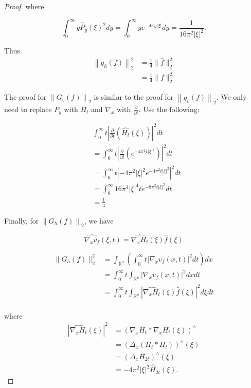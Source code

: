 \begin{enumerate}
\begin{proof}
	where

	\[
		\int_0^\infty y \widehat{P}_y(\xi) ^2 dy = \int_0^\infty y e^{-4 \pi y |\xi|} dy = \frac{1}{16 \pi^2 |\xi|^2}
	.\]

	Thus
	\begin{align*}
		\left\|g_h(f)\right\|_2^2
		&= \frac{1}{4} \|\hat{f}\|_2^2 \\
		&= \frac{1}{4} \|f\|_2^2
	\end{align*}

	The proof for $\left\|G_v(f)\right\|_2$ is similar to the proof for $\left\|g_v(f)\right\|_2$. We only need to replace $P_y$ with $H_t$ and $\nabla_x$ with $\frac{\partial}{\partial t}$. Use the following:

	\begin{align*}
		&\int_{0}^{\infty} t \left| \frac{\partial}{\partial t} \left( \hat{H_t}(\xi) \right) \right| ^2 d t \\
		&= \int_{0}^{\infty} t \left| \frac{\partial}{\partial t} \left( e^{-4 \pi^2 t |\xi|^2} \right) \right| ^2 d t \\
		&= \int_{0}^{\infty} t \left| - 4 \pi^2 |\xi|^2 e^{-4 \pi^2 t |\xi|^2} \right| ^2 d t \\
		&= \int_{0}^{\infty} 16 \pi^4 |\xi|^4 t e^{-8 \pi^2 t |\xi|^2} d t \\
		&= \frac{1}{4}
	\end{align*}

	Finally, for $\left\|G_h(f)\right\|_2$, we have	

	\[
		 \widehat{\nabla_x v_f}(\xi, t) 
		 = \widehat{\nabla_x H_t}(\xi) \hat{f}(\xi)
	\]


	\begin{align*}
		\| G_h(f) \|_2^2
		&= \int _{\mathbb{R}^n} \left( \int _0^\infty t \left| \nabla_x v_f(x, t) \right| ^2 dt \right) dx \\
		&= \int_0 ^\infty t \int _{\mathbb{R}^n} \left| \nabla_x v_f(x, t) \right| ^2 dx dt \\
		&= \int _0^\infty t \int _{\mathbb{R}^n} \left|  \widehat{\nabla_x H_t}(\xi) \hat{f}(\xi) \right| ^2 d \xi dt \\
	\end{align*}
	
	where
	\begin{align*}
		| \widehat{\nabla_x H_t}(\xi) |^2
		&= \left( \nabla_x H_t * \nabla_x H_t(\xi) \right)^\wedge \\
		&= (\Delta_x \left( H_t *  H_t \right))^\wedge (\xi) \\
		&= (\Delta_x H_{2 t} )^\wedge (\xi) \\
		&= -4 \pi^2 |\xi|^2 \hat{H}_{2 t}(\xi) 
	.\end{align*}


\end{proof}
\end{enumerate}
